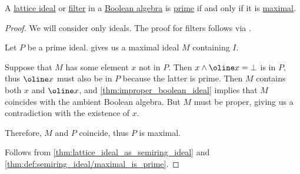 \begin{proposition}\label{thm:boolean_prime_iff_maximal}
  A \hyperref[def:lattice_ideal]{lattice ideal} or \hyperref[def:lattice_ideal]{filter} in a \hyperref[def:boolean_algebra]{Boolean algebra} is \hyperref[def:lattice_ideal/prime]{prime} if and only if it is \hyperref[def:lattice_ideal/maximal]{maximal}.
\end{proposition}
\begin{proof}
  We will consider only ideals. The proof for filters follows via .

  \SufficiencySubProof Let \( P \) be a prime ideal.  gives us a maximal ideal \( M \) containing \( I \).

  Suppose that \( M \) has some element \( x \) not in \( P \). Then \( x \wedge \oline x = \bot \) is in \( P \), thus \( \oline x \) must also be in \( P \) because the latter is prime. Then \( M \) contains both \( x \) and \( \oline x \), and \cref{thm:improper_boolean_ideal} implies that \( M \) coincides with the ambient Boolean algebra. But \( M \) must be proper, giving us a contradiction with the existence of \( x \).

  Therefore, \( M \) and \( P \) coincide, thus \( P \) is maximal.

  \NecessitySubProof Follows from \cref{thm:lattice_ideal_as_semiring_ideal} and \cref{thm:def:semiring_ideal/maximal_is_prime}.
\end{proof}

